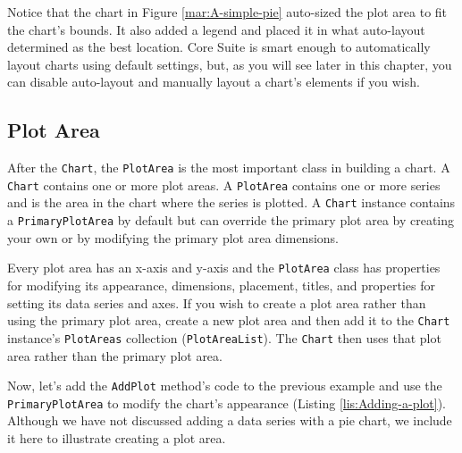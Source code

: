 \documentclass[american]{tufte-book}
\numberwithin{equation}{section}
\numberwithin{figure}{section}
\begin{document}
{Notice that the chart in Figure \ref{mar:A-simple-pie} auto-sized
the plot area to fit the chart's bounds. It also added a legend and
placed it in what auto-layout determined as the best location. Core
Suite is smart enough to automatically layout charts using default
settings, but, as you will see later in this chapter, you can disable
auto-layout and manually layout a chart's elements if you wish.

\subsection{Plot Area}
After the \texttt{Chart}, the \texttt{PlotArea} is the most important
class in building a chart. A \texttt{Chart} contains one or more plot
areas. A \texttt{PlotArea} contains one or more series and is the
area in the chart where the series is plotted. A \texttt{Chart} instance
contains a \texttt{PrimaryPlotArea} by default but can override the
primary plot area by creating your own or by modifying the primary
plot area dimensions.

Every plot area has an x-axis and y-axis and the \texttt{PlotArea}
class has properties for modifying its appearance, dimensions, placement,
titles, and properties for setting its data series and axes. If you
wish to create a plot area rather than using the primary plot area,
create a new plot area and then add it to the \texttt{Chart} instance's
\texttt{PlotAreas} collection (\texttt{PlotAreaList}). The \texttt{Chart}
then uses that plot area rather than the primary plot area.

Now, let's add the \texttt{AddPlot} method's code to the previous
example and use the \texttt{PrimaryPlotArea} to modify the chart's
appearance (Listing \ref{lis:Adding-a-plot}). Although we have not
discussed adding a data series with a pie chart, we include it here
to illustrate creating a plot area. 

}
\end{document}
